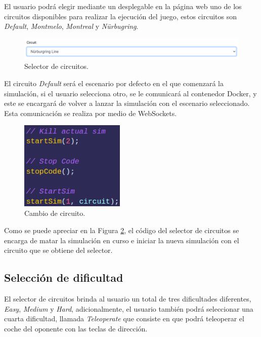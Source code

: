 \documentclass[a4paper, 12pt]{book}
\begin{document}
El usuario podrá elegir mediante un desplegable en la página web uno de los circuitos disponibles para realizar la ejecución del juego, estos circuitos son \emph{Default}, \emph{Montmelo}, \emph{Montreal} y \emph{Nürbugring}. 

\begin{figure}[H]
	\centering
    \includegraphics[width=15cm]{img/circuit_selector.png}
    \caption{Selector de circuitos.}
    \label{figura:circuit_selector}
\end{figure}

El circuito \emph{Default} será el escenario por defecto en el que comenzará la simulación, si el usuario selecciona otro, se le comunicará al contenedor Docker, y este se encargará de volver a lanzar la simulación con el escenario seleccionado. Esta comunicación se realiza por medio de WebSockets.

\begin{figure}[H]
	\centering
    \includegraphics[width=5cm]{img/select_circuit_code.png}
    \caption{Cambio de circuito.}
    \label{figura:circuit_change_code}
\end{figure}

Como se puede apreciar en la Figura \ref{figura:circuit_change_code}, el código del selector de circuitos se encarga de matar la simulación en curso e iniciar la nueva simulación con el circuito que se obtiene del selector.

\subsection{Selección de dificultad}
\label{subsec:follow_line_game_circuito}

El selector de circuitos brinda al usuario un total de tres dificultades diferentes, \emph{Easy}, \emph{Medium} y \emph{Hard}, adicionalmente, el usuario también podrá seleccionar una cuarta dificultad, llamada \emph{Teleoperate} que consiste en que podrá teleoperar el coche del oponente con las teclas de dirección.
\end{document}
